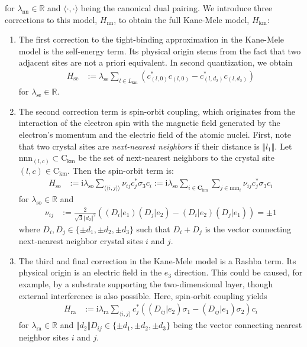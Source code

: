 for $\lambda_{\textrm{nn}} \in \mathbb{R}$ and $\langle \cdot,\cdot \rangle$ being the canonical dual pairing.
We introduce three corrections to this model, $H_{\textrm{nn}}$, to obtain the full Kane-Mele model, $H_{\textrm{km}}$:
\begin{enumerate}
\item[(SE)]
  The first correction to the tight-binding approximation in the Kane-Mele model is the self-energy term.
  Its physical origin stems from the fact that two adjacent sites are not a priori equivalent.
  In second quantization, we obtain
\begin{align*}
  H_{\textrm{se}}
  &:=
  \lambda_{\textrm{se}}
  \sum_{l \in L_{\textrm{km}}}
  \left(
    c_{(l,0)}^{\ast}
    c_{(l,0)}
    -
    c_{(l,d_{2})}^{\ast}
    c_{(l,d_{2})}
  \right)
\end{align*}
for $\lambda_{\textrm{se}} \in \mathbb{R}$.
\item[(SO)]
  The second correction term is spin-orbit coupling, which originates from the interaction of the electron spin with the magnetic field generated by the electron's momentum and the electric field of the atomic nuclei.
  First, note that two crystal sites are \textit{next-nearest neighbors} if their distance is $\Vert l_{1} \Vert$.
  Let $\textrm{nnn}_{(l,c)} \subset \mathrm{C}_{\textrm{km}}$ be the set of next-nearest neighbors to the crystal site $(l,c) \in \mathrm{C}_{\textrm{km}}$.
  Then the spin-orbit term is:
\begin{align*}
  H_{\textrm{so}}
  &:=
  \mathrm{i}
  \lambda_{\textrm{so}}
  \sum_{\langle\langle i,j \rangle\rangle}
  \nu_{ij}
  c_{j}^{\ast}
  \sigma_{3}
  c_{i}
  :=
  \mathrm{i}
  \lambda_{\textrm{so}}
  \sum_{i \in \mathbf{C}_{\textrm{km}}}
  \sum_{j \in \textrm{nnn}_{i}}
  \nu_{ij}
  c_{j}^{\ast}
  \sigma_{3}
  c_{i}
\end{align*}
for $\lambda_{\textrm{so}} \in \mathbb{R}$ and
\begin{align*}
  \nu_{ij}
  &:=
  \frac{2}{\sqrt{3}\Vert d_{2} \Vert^{2}}
  \left(
    (D_{i} \vert e_{1})
    (D_{j} \vert e_{2})
    -
    (D_{i} \vert e_{2})
    (D_{j} \vert e_{1})
  \right)
  =
  \pm
  1
\end{align*}
where $D_{i},D_{j} \in \lbrace \pm d_{1},\pm d_{2},\pm d_{3} \rbrace$ such that $D_{i} + D_{j}$ is the vector connecting next-nearest neighbor crystal sites $i$ and $j$.
\item[(RA)]
The third and final correction in the Kane-Mele model is a Rashba term.
Its physical origin is an electric field in the $e_{3}$ direction.
This could be caused, for example, by a substrate supporting the two-dimensional layer, though external interference is also possible.
Here, spin-orbit coupling yields
\begin{align*}
  H_{\textrm{ra}}
  &:=
  \mathrm{i}
  \lambda_{\textrm{ra}}
  \sum_{\langle i,j \rangle}
  c_{j}^{\ast}
  ((D_{ij}\vert e_{2})\sigma_{1} - (D_{ij} \vert e_{1})\sigma_{2})
  c_{i}
\end{align*}
for $\lambda_{\textrm{ra}} \in \mathbb{R}$ and $\Vert d_{2} \Vert D_{ij} \in \lbrace \pm d_{1},\pm d_{2},\pm d_{3} \rbrace$ being the vector connecting nearest neighbor sites $i$ and $j$.
\end{enumerate}
